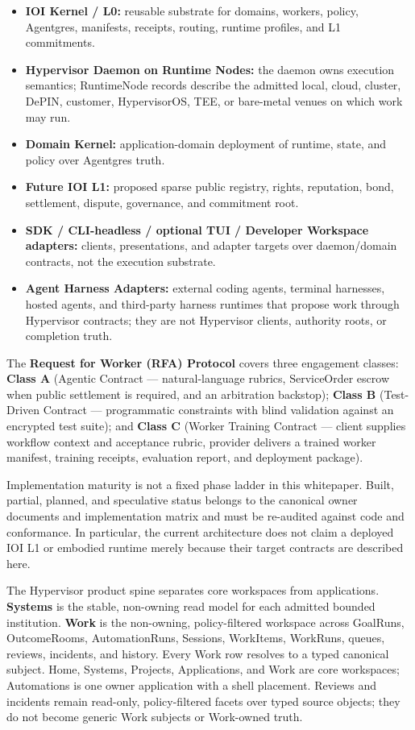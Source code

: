 \documentclass[
  11pt,
]{article}
\providecommand{\tightlist}{%
  \setlength{\itemsep}{0pt}\setlength{\parskip}{0pt}}
\begin{document}
\begin{itemize}
\tightlist
\item
  \textbf{IOI Kernel / L0:} reusable substrate for domains, workers,
  policy, Agentgres, manifests, receipts, routing, runtime profiles, and
  L1 commitments.
\item
  \textbf{Hypervisor Daemon on Runtime Nodes:} the daemon owns execution
  semantics; RuntimeNode records describe the admitted local, cloud,
  cluster, DePIN, customer, HypervisorOS, TEE, or bare-metal venues on
  which work may run.
\item
  \textbf{Domain Kernel:} application-domain deployment of runtime,
  state, and policy over Agentgres truth.
\item
  \textbf{Future IOI L1:} proposed sparse public registry, rights,
  reputation, bond, settlement, dispute, governance, and commitment root.
\item
  \textbf{SDK / CLI-headless / optional TUI / Developer Workspace adapters:}
  clients, presentations, and adapter targets over daemon/domain
  contracts, not the execution substrate.
\item
  \textbf{Agent Harness Adapters:} external coding agents, terminal
  harnesses, hosted agents, and third-party harness runtimes that propose
  work through Hypervisor contracts; they are not Hypervisor clients,
  authority roots, or completion truth.
\end{itemize}

The \textbf{Request for Worker (RFA) Protocol} covers three engagement
classes: \textbf{Class A} (Agentic Contract --- natural-language
rubrics, ServiceOrder escrow when public settlement is required, and an
arbitration backstop); \textbf{Class B} (Test-Driven Contract ---
programmatic constraints with blind validation against an encrypted test
suite); and \textbf{Class C} (Worker Training Contract --- client
supplies workflow context and acceptance rubric, provider delivers a
trained worker manifest, training receipts, evaluation report, and
deployment package).

Implementation maturity is not a fixed phase ladder in this whitepaper.
Built, partial, planned, and speculative status belongs to the canonical
owner documents and implementation matrix and must be re-audited against
code and conformance. In particular, the current architecture does not claim
a deployed IOI L1 or embodied runtime merely because their target contracts
are described here.

The Hypervisor product spine separates core workspaces from applications.
\textbf{Systems} is the stable, non-owning read model for each admitted
bounded institution. \textbf{Work} is the non-owning, policy-filtered
workspace across GoalRuns, OutcomeRooms, AutomationRuns, Sessions, WorkItems,
WorkRuns, queues, reviews, incidents, and history. Every Work row resolves to
a typed canonical subject. Home, Systems, Projects, Applications, and Work are
core workspaces; Automations is one owner application with a shell placement.
Reviews and incidents remain read-only, policy-filtered facets over typed
source objects; they do not become generic Work subjects or Work-owned truth.
\end{document}
